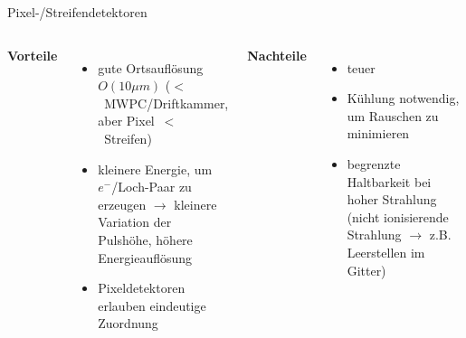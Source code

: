 \begin{frame}{Pixel-/Streifendetektoren}
    \begin{columns}[T]
			\textbf{Vorteile}		
			\begin{itemize}
			  \item gute Ortsauflösung $O(10\mu m)$  ($<$~MWPC/Driftkammer, aber Pixel~$<$~Streifen)
			  \item kleinere Energie, um $e^-$/Loch-Paar zu erzeugen $\rightarrow$ kleinere Variation der
			  Pulshöhe, höhere Energieauflösung
			  \item Pixeldetektoren erlauben eindeutige Zuordnung
			\end{itemize}	
	    	\textbf{Nachteile}
	    	\begin{itemize}
			  \item teuer
			  \item Kühlung notwendig, um Rauschen zu minimieren
			  \item begrenzte Haltbarkeit bei hoher Strahlung (nicht ionisierende Strahlung $\rightarrow$
			  z.B. Leerstellen im Gitter)
			\end{itemize}
    \end{columns}
   \end{frame}
   
